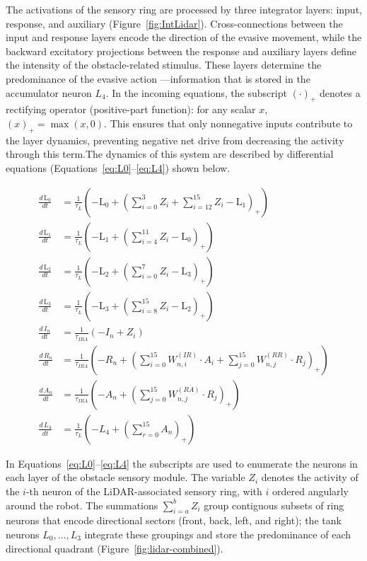 \documentclass[preprint,12pt]{elsarticle}
\begin{document}
The activations of the sensory ring are processed by three integrator layers: input, response, and auxiliary (Figure~\ref{fig:IntLidar}). Cross-connections between the input and response layers encode the direction of the evasive movement, while the backward excitatory projections between the response and auxiliary layers define the intensity of the obstacle-related stimulus. These layers determine the predominance of the evasive action ---information that is stored in the accumulator neuron $L_4$. In the incoming equations, the subscript $(\cdot)_+$ denotes a rectifying operator (positive-part function): for any scalar $x$, $(x)_+ = \max(x,0)$. This ensures that only nonnegative inputs contribute to the layer dynamics, preventing negative net drive from decreasing the activity through this term.The dynamics of this system are described by differential equations (Equations~\eqref{eq:L0}–\eqref{eq:L4}) shown below. 

\begin{align}
\frac{d\, \text{L}_0}{dt} &= \frac{1}{\tau_{L}} \left( -\text{L}_0 + \left( \sum_{i=0}^{3} Z_i + \sum_{i=12}^{15} Z_i - \text{L}_1 \right)_+ \right)\label{eq:L0}\\
\frac{d\, \text{L}_1}{dt} &= \frac{1}{\tau_{L}} \left( -\text{L}_1 + \left( \sum_{i=4}^{11} Z_i - \text{L}_0 \right)_+ \right)\label{eq:L1}\\
\frac{d\, \text{L}_2}{dt} &= \frac{1}{\tau_{L}} \left( -\text{L}_2 + \left( \sum_{i=0}^{7} Z_i - \text{L}_3 \right)_+ \right)\label{eq:L2}\\
\frac{d\, \text{L}_3}{dt} &= \frac{1}{\tau_{L}} \left( -\text{L}_3 + \left( \sum_{i=8}^{15} Z_i - \text{L}_2 \right)_+ \right)\label{eq:L3}\\
\frac{d\, I_n}{dt} &= \frac{1}{\tau_{IRA}} \left( -I_n + Z_i \right)\label{eq:InputL}\\
\frac{d\, R_n}{dt} &= \frac{1}{\tau_{IRA}} \left( -R_n + \left(\sum_{i=0}^{15} W^{(IR)}_{n,i} \cdot A_i + \sum_{j=0}^{15} W^{(RR)}_{n,j} \cdot R_j \right)_+\right)\label{eq:ResL}\\
\frac{d\, A_n}{dt} &= \frac{1}{\tau_{IRA}} \left( -A_n + \left(\sum_{j=0}^{15} W^{(RA)}_{n,j} \cdot R_j \right)_+ \right)\label{eq:AuxL}\\
\frac{d\, L_4}{dt} &= \frac{1}{\tau_L} \left( -L_4 + \left(\sum_{r=0}^{15} A_n \right) _+\right)\label{eq:L4}
\end{align}

In Equations~\eqref{eq:L0}–\eqref{eq:L4} the subscripts are used to enumerate the neurons in each layer of the obstacle sensory module. The variable $Z_i$ denotes the activity of the $i$-th neuron of the LiDAR-associated sensory ring, with $i$ ordered angularly around the robot. The summations $\sum_{i=a}^{b} Z_i$ group contiguous subsets of ring neurons that encode directional sectors (front, back, left, and right); the tank neurons $L_0,\dots,L_3$ integrate these groupings and store the predominance of each directional quadrant (Figure~\ref{fig:lidar-combined}).
\end{document}
